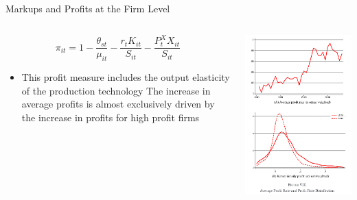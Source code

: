 \documentclass{beamer}
\begin{document}
  \begin{frame}{Markups and Profits at the Firm Level}
    \begin{columns}
\begin{column}{0.5\textwidth}
  \[\pi_{it} = 1 - \frac{\theta_{st}}{\mu_{it}} - \frac{r_t K_{it}}{S_{it}} - \frac{P_t^X X_{it}}{S_{it}}\]
  \begin{itemize}
  \item This profit measure includes the output elasticity of the production technology
    \vitem The increase in average profits is almost exclusively driven by the increase in profits for high profit firms
  \end{itemize}
\end{column}
\begin{column}{0.5\textwidth}  %
    \begin{center}
     \includegraphics[width=\textwidth, keepaspectratio=true]{fig8.png}
     \end{center}
\end{column}
\end{columns}
  \end{frame}
\end{document}
